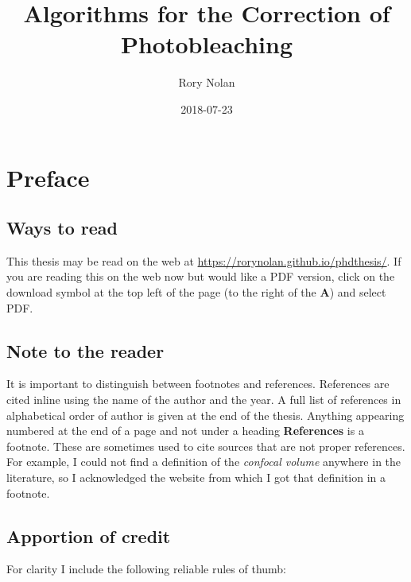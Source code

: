 \documentclass[12pt,]{book}
\title{Algorithms for the Correction of Photobleaching}
\author{Rory Nolan}
\date{2018-07-23}
\theoremstyle{definition}
\theoremstyle{definition}
\theoremstyle{definition}
\theoremstyle{remark}
\begin{document}
\maketitle

{
\hypersetup{linkcolor=blue}
\setcounter{tocdepth}{1}
\tableofcontents
}
\chapter*{Preface}\label{preface}

\section*{Ways to read}\label{ways-to-read}

This thesis may be read on the web at
\url{https://rorynolan.github.io/phdthesis/}. If you are reading this on
the web now but would like a PDF version, click on the download symbol
at the top left of the page (to the right of the \textbf{A}) and select
PDF.

\section*{Note to the reader}\label{note-to-the-reader}

It is important to distinguish between footnotes and references.
References are cited inline using the name of the author and the year. A
full list of references in alphabetical order of author is given at the
end of the thesis. Anything appearing numbered at the end of a page and
not under a heading \textbf{References} is a footnote. These are
sometimes used to cite sources that are not proper references. For
example, I could not find a definition of the \emph{confocal volume}
anywhere in the literature, so I acknowledged the website from which I
got that definition in a footnote.

\section*{Apportion of credit}\label{apportion-of-credit}

For clarity I include the following reliable rules of thumb:
\end{document}
